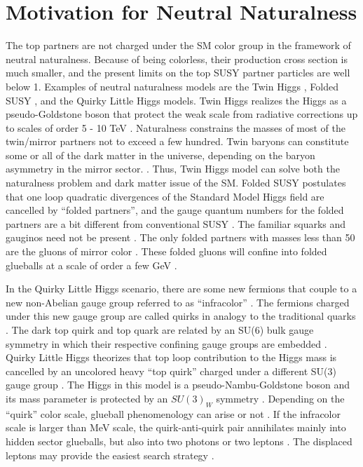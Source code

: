 \section{Motivation for Neutral Naturalness}
The top partners are not charged under the SM color group in the framework of neutral naturalness.
Because of being colorless, their production cross section is much smaller, and the present limits on the top SUSY partner particles are well below 1\TeV.
Examples of neutral naturalness models are the Twin Higgs \cite{Chacko:2005pe},
Folded SUSY \cite{Burdman:2006tz}, and the Quirky Little Higgs \cite{Cai:2008au} models.
Twin Higgs realizes the Higgs as a pseudo-Goldstone boson that protect the weak scale from radiative corrections up to scales of order 5 - 10 TeV \cite{Chacko:2005pe}.
Naturalness constrains the masses of most of the twin/mirror partners not to exceed a few hundred\GeV \cite{Chacko:2005pe}.
Twin baryons can constitute some or all of the dark matter in the universe, depending on the baryon asymmetry in the mirror sector. \cite{Chacko:2005pe}.
Thus, Twin Higgs model can solve both the naturalness problem and dark matter issue of the SM.
Folded SUSY postulates that one loop quadratic divergences of the Standard Model Higgs field are cancelled by ``folded partners'', and the gauge quantum numbers for the folded partners are a bit different from conventional SUSY \cite{Burdman:2006tz}.
The familiar squarks and gauginos need not be present \cite{Burdman:2006tz}.
The only folded partners with masses less than 50 \GeV are the gluons of mirror color \cite{Burdman:2006tz}. 
These folded gluons will confine into folded glueballs at a scale of order a few GeV \cite{Burdman:2006tz}.



In the Quirky Little Higgs scenario, there are some new fermions that couple to a new non-Abelian gauge group referred to as ``infracolor'' \cite{Cai:2008au}.
The fermions charged under this new gauge group are called quirks in analogy to the traditional quarks \cite{Cai:2008au}.
The dark top quirk and top quark are related by an SU(6) bulk gauge symmetry in which their respective confining gauge groups are embedded \cite{Cai:2008au}. 
Quirky Little Higgs theorizes that top loop contribution to the Higgs mass is cancelled by an uncolored heavy ``top quirk'' charged under a different SU(3) gauge group \cite{Cai:2008au}. 
The Higgs in this model is a pseudo-Nambu-Goldstone boson and its mass parameter is protected by an $SU(3)_{W}$ symmetry \cite{Cai:2008au}.
Depending on the ``quirk'' color scale, glueball phenomenology can arise or not \cite{Cai:2008au}.
If the infracolor scale is larger than MeV scale, the quirk-anti-quirk pair annihilates mainly into hidden sector glueballs, but also into two photons or two leptons \cite{Cai:2008au}. 
The displaced leptons may provide the easiest search strategy \cite{Cai:2008au}.

